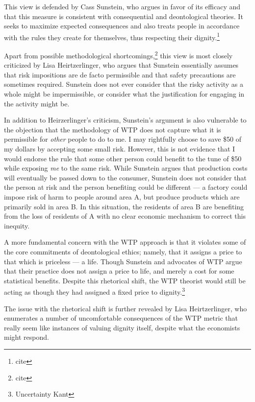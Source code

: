 This view is defended by Cass Sunstein, who argues in favor of its efficacy and
that this measure is consistent with consequential and deontological theories.
It seeks to maximize expected consequences and also treats people in accordance
with the rules they create for themselves, thus respecting their
dignity.\footnote{cite}

Apart from possible methodological shortcomings,\footnote{cite} this view is
most closely criticized by Lisa Heirtzerlinger, who argues that Sunstein
essentially assumes that risk impositions are de facto permissible and that
safety precautions are sometimes required. Sunstein does not ever consider that
the risky activity as a whole might be impermissible, or consider what the
justification for engaging in the activity might be.

In addition to Heirzerlinger’s criticism, Sunstein’s argument is also
vulnerable to the objection that the methodology of WTP does not capture what
it is permissible for \emph{other} people to do to me. I may rightfully choose
to save \$50 of my dollars by accepting some small risk. However, this is not
evidence that I would endorse the rule that some other person could benefit to
the tune of \$50 while exposing \emph{me} to the same
risk.\autocite[98]{hansson_risk} While Sunstein argues that production costs
will eventually be passed down to the consumer, Sunstein does not consider that
the person at risk and the person benefiting could be different --- a factory
could impose risk of harm to people around area A, but produce products which
are primarily sold in area B. In this situation, the residents of area B are
benefiting from the loss of residents of A with no clear economic mechanism to
correct this inequity.

A more fundamental concern with the WTP approach is that it violates some of
the core commitments of deontological ethics; namely, that it assigns a price
to that which is priceless --- a life. Though Sunstein and advocates of WTP
argue that their practice does not assign a price to life, and merely a cost
for some statistical benefits. Despite this rhetorical shift, the WTP theorist
would still be acting as though they had assigned a fixed price to
dignity.\footnote{Uncertainty Kant}

The issue with the rhetorical shift is further revealed by Lisa Heirtzerlinger,
who enumerates a number of uncomfortable consequences of the WTP metric that
really seem like instances of valuing dignity itself, despite what the
economists might respond.

